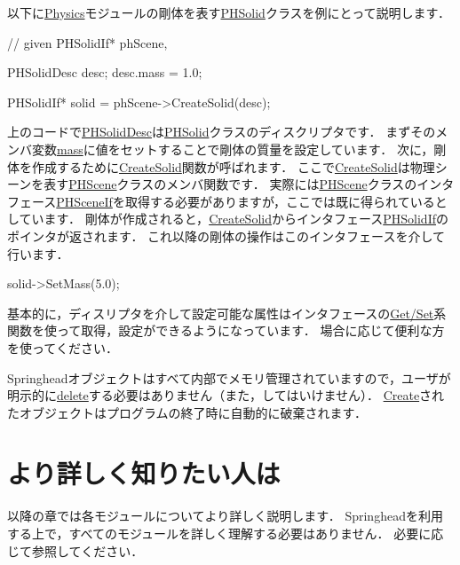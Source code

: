 \KLUDGE 以下に\url{Physics}\KLUDGE モジュールの剛体を表す\url{PHSolid}\KLUDGE クラスを例にとって説明します．
\begin{sourcecode}
// given PHSolidIf* phScene, 

PHSolidDesc desc;
desc.mass = 1.0;

PHSolidIf* solid = phScene->CreateSolid(desc);
\end{sourcecode}
\KLUDGE 上のコードで\url{PHSolidDesc}\KLUDGE は\url{PHSolid}\KLUDGE クラスのディスクリプタです．
\KLUDGE まずそのメンバ変数\url{mass}\KLUDGE に値をセットすることで剛体の質量を設定しています．
\KLUDGE 次に，剛体を作成するために\url{CreateSolid}\KLUDGE 関数が呼ばれます．
\KLUDGE ここで\url{CreateSolid}\KLUDGE は物理シーンを表す\url{PHScene}\KLUDGE クラスのメンバ関数です．
\KLUDGE 実際には\url{PHScene}\KLUDGE クラスのインタフェース\url{PHSceneIf}\KLUDGE を取得する必要がありますが，ここでは既に得られているとしています．
\KLUDGE 剛体が作成されると，\url{CreateSolid}\KLUDGE からインタフェース\url{PHSolidIf}\KLUDGE のポインタが返されます．
\KLUDGE これ以降の剛体の操作はこのインタフェースを介して行います．
\begin{sourcecode}
solid->SetMass(5.0);
\end{sourcecode}
\KLUDGE 基本的に，ディスリプタを介して設定可能な属性はインタフェースの\url{Get/Set}\KLUDGE 系関数を使って取得，設定ができるようになっています．
\KLUDGE 場合に応じて便利な方を使ってください．

Springhead\KLUDGE オブジェクトはすべて内部でメモリ管理されていますので，ユーザが明示的に\url{delete}\KLUDGE する必要はありません（また，してはいけません）．
\url{Create}\KLUDGE されたオブジェクトはプログラムの終了時に自動的に破棄されます．

\section*{\KLUDGE より詳しく知りたい人は}

\KLUDGE 以降の章では各モジュールについてより詳しく説明します．
Springhead\KLUDGE を利用する上で，すべてのモジュールを詳しく理解する必要はありません．
\KLUDGE 必要に応じて参照してください．
